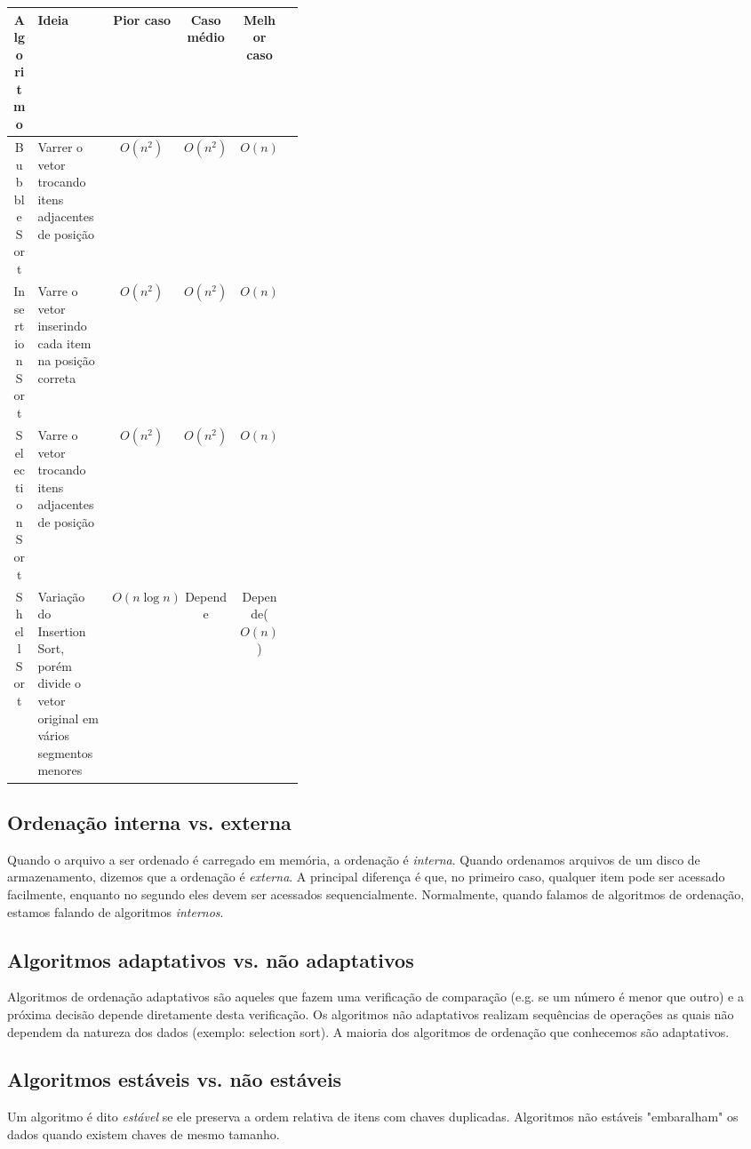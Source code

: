 \documentclass[a4paper, 11pt, brazil]{article}
\begin{document}
\begin{center}
\begin{tabular}{ |c|p{0.375\linewidth}|c|c|c|c| } 
 \hline
 Algoritmo & Ideia & Pior caso & Caso médio & Melhor caso \\
 \hline
 Bubble Sort & Varrer o vetor trocando itens adjacentes de posição & $O(n^2)$ & $O(n^2)$ & $O(n)$ \\
 Insertion Sort & Varre o vetor inserindo cada item na posição correta & $O(n^2)$ & $O(n^2)$ & $O(n)$ \\
 Selection Sort & Varre o vetor trocando itens adjacentes de posição & $O(n^2)$ & $O(n^2)$ & $O(n)$ \\
 Shell Sort & Variação do Insertion Sort, porém divide o vetor original em vários segmentos menores & $O(n \log{n})$ & Depende & Depende($O(n)$) \\
 \hline
\end{tabular}
\end{center}

\subsection*{Ordenação interna vs. externa}
Quando o arquivo a ser ordenado é carregado em memória, a ordenação é \textit{interna}. Quando ordenamos arquivos de um disco de armazenamento, dizemos que a ordenação é \textit{externa}. A principal diferença é que, no primeiro caso, qualquer item pode ser acessado facilmente, enquanto no segundo eles devem ser acessados sequencialmente. Normalmente, quando falamos de algoritmos de ordenação, estamos falando de algoritmos \textit{internos}.
\subsection*{Algoritmos adaptativos vs. não adaptativos}
Algoritmos de ordenação adaptativos são aqueles que fazem uma verificação de comparação (e.g. se um número é menor que outro) e a próxima decisão depende diretamente desta verificação. Os algoritmos não adaptativos realizam sequências de operações as quais não dependem da natureza dos dados (exemplo: selection sort). A maioria dos algoritmos de ordenação que conhecemos são adaptativos.

\subsection*{Algoritmos estáveis vs. não estáveis}
Um algoritmo é dito \textit{estável} se ele preserva a ordem relativa de itens com chaves duplicadas. Algoritmos não estáveis "embaralham" os dados quando existem chaves de mesmo tamanho.
\end{document}
